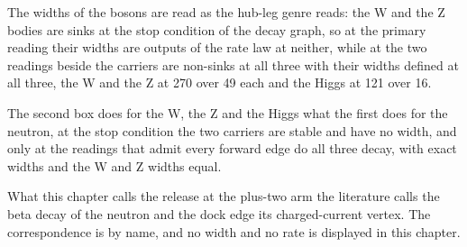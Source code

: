 \begin{chwall}\label{box:VI-8-beta-decay-and-the-boson-widths:2}
The widths of the bosons are read as the hub-leg genre reads: the W and the Z bodies are sinks at the stop condition of the decay graph, so at the primary reading their widths are outputs of the rate law at neither, while at the two readings beside the carriers are non-sinks at all three with their widths defined at all three, the W and the Z at 270 over 49 each and the Higgs at 121 over 16.
\end{chwall}
The second box does for the W, the Z and the Higgs what the first does for the neutron, at the stop condition the two carriers are stable and have no width, and only at the readings that admit every forward edge do all three decay, with exact widths and the W and Z widths equal.
\begin{chbridge}
What this chapter calls the release at the plus-two arm the literature calls the beta decay of the neutron and the dock edge its charged-current vertex. The correspondence is by name, and no width and no rate is displayed in this chapter.
\end{chbridge}

